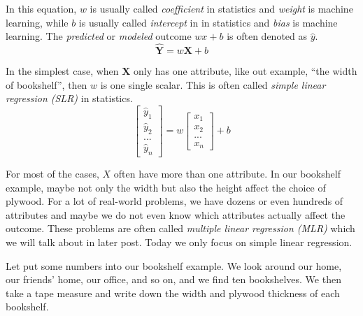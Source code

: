 \documentclass[
	letterpaper
]{article}
\begin{document}
In this equation, $w$ is usually called \textit{coefficient} in statistics and \textit{weight} is machine learning, while $b$ is usually called \textit{intercept} in in statistics and \textit{bias} is machine learning.
The \textit{predicted} or \textit{modeled} outcome $wx+b$ is often denoted as $\hat y$.
\begin{equation}
\mathbf{\hat Y} = w\mathbf{X}+b
\end{equation}

In the simplest case, when $\mathbf{X}$ only has one attribute, like out example, ``the width of bookshelf'', then $w$ is one single scalar.
This is often called \textit{simple linear regression (SLR)} in statistics.
\begin{equation}
\begin{bmatrix}\hat y_1 \\ \hat y_2 \\ ... \\ \hat y_n\end{bmatrix}
 = w\begin{bmatrix} x_1 \\  x_2 \\ ... \\ x_n\end{bmatrix}+b
\end{equation}

For most of the cases, $X$ often have more than one attribute. 
In our bookshelf example, maybe not only the width but also the height affect the choice of plywood.
For a lot of real-world problems, we have dozens or even hundreds of attributes and maybe we do not even know which attributes actually affect the outcome.
These problems are often called \textit{multiple linear regression (MLR)} which we will talk about in later post.
Today we only focus on simple linear regression.

Let put some numbers into our bookshelf example.
We look around our home, our friends' home, our office, and so on, and we find ten bookshelves.
We then take a tape measure and write down the width and plywood thickness of each bookshelf.
\end{document}
